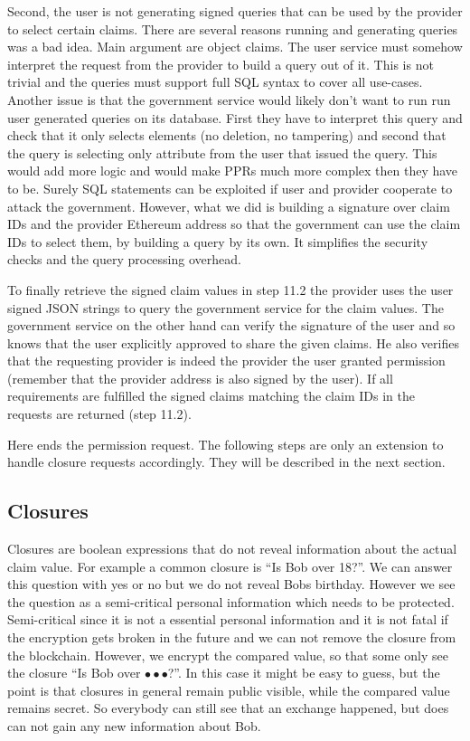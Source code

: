 Second, the user is not generating signed queries that can be used by the provider to select certain claims. There are several reasons running and generating queries was a bad idea. Main argument are object claims. The user service must somehow interpret the request from the provider to build a query out of it. This is not trivial and the queries must support full SQL syntax to cover all use-cases. Another issue is that the government service would likely don’t want to run run user generated queries on its database. First they have to interpret this query and check that it only selects elements (no deletion, no tampering) and second that the query is selecting only attribute from the user that issued the query. 
This would add more logic and would make PPRs much more complex then they have to be. Surely SQL statements can be exploited if user and provider cooperate to attack the government.
However, what we did is building a signature over claim IDs and the provider Ethereum address so that the government can use the claim IDs to select them, by building a query by its own. It simplifies the security checks and the query processing overhead.

To finally retrieve the signed claim values in step 11.2 the provider uses the user signed JSON strings to query the government service for the claim values. The government service on the other hand can verify the signature of the user and so knows that the user explicitly approved to share the given claims. He also verifies that the requesting provider is indeed the provider the user granted permission (remember that the provider address is also signed by the user). If all requirements are fulfilled the signed claims matching the claim IDs in the requests are returned (step 11.2).

Here ends the permission request. The following steps are only an extension to handle closure requests accordingly. They will be described in the next section.     

\subsection{Closures}
\label{sec:closure}
Closures are boolean expressions that do not reveal information about the actual claim value. For example a common closure is “Is Bob over 18?”. We can answer this question with yes or no but we do not reveal Bobs birthday. However we see the question as a semi-critical personal information which needs to be protected. Semi-critical since it is not a essential personal information and it is not fatal if the encryption gets broken in the future and we can not remove the closure from the blockchain. However, we encrypt the compared value, so that some only see the closure “Is Bob over $\bullet\bullet\bullet$?”. In this case it might be easy to guess, but the point is that closures in general remain public visible, while the compared value remains secret. So everybody can still see that an exchange happened, but does can not gain any new information about Bob. 

